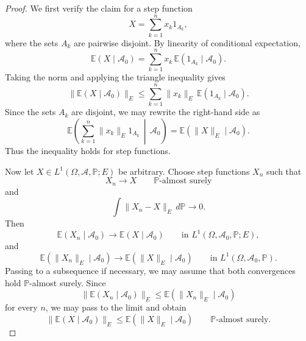 \documentclass[11pt]{article}
\theoremstyle{definition}
\theoremstyle{remark}
\begin{document}
\begin{proof}
We first verify the claim for a step function
\[
X=\sum_{k=1}^{n}x_k1_{A_k},
\]
where the sets \(A_k\) are pairwise disjoint. By linearity of conditional expectation,
\[
\mathbb E(X\mid \mathcal A_0)=\sum_{k=1}^{n}x_k\,\mathbb E(1_{A_k}\mid \mathcal A_0).
\]
Taking the norm and applying the triangle inequality gives
\[
\|\mathbb E(X\mid \mathcal A_0)\|_E
\le
\sum_{k=1}^{n}\|x_k\|_E\,\mathbb E(1_{A_k}\mid \mathcal A_0).
\]
Since the sets \(A_k\) are disjoint, we may rewrite the right-hand side as
\[
\mathbb E\left(\sum_{k=1}^{n}\|x_k\|_E1_{A_k}\,\middle|\,\mathcal A_0\right)
=
\mathbb E(\|X\|_E\mid \mathcal A_0).
\]
Thus the inequality holds for step functions.

Now let \(X\in L^1(\Omega,\mathcal A,\mathbb P;E)\) be arbitrary. Choose step functions \(X_n\) such that
\[
X_n\to X
\qquad \mathbb P\text{-almost surely}
\]
and
\[
\int \|X_n-X\|_E\,d\mathbb P\to 0.
\]
Then
\[
\mathbb E(X_n\mid \mathcal A_0)\to \mathbb E(X\mid \mathcal A_0)
\qquad \text{in } L^1(\Omega,\mathcal A_0,\mathbb P;E),
\]
and
\[
\mathbb E(\|X_n\|_E\mid \mathcal A_0)\to \mathbb E(\|X\|_E\mid \mathcal A_0)
\qquad \text{in } L^1(\Omega,\mathcal A_0,\mathbb P).
\]
Passing to a subsequence if necessary, we may assume that both convergences hold \(\mathbb P\)-almost surely. Since
\[
\|\mathbb E(X_n\mid \mathcal A_0)\|_E\le \mathbb E(\|X_n\|_E\mid \mathcal A_0)
\]
for every \(n\), we may pass to the limit and obtain
\[
\|\mathbb E(X\mid \mathcal A_0)\|_E\le \mathbb E(\|X\|_E\mid \mathcal A_0)
\qquad \mathbb P\text{-almost surely.}
\]
\end{proof}
\end{document}
